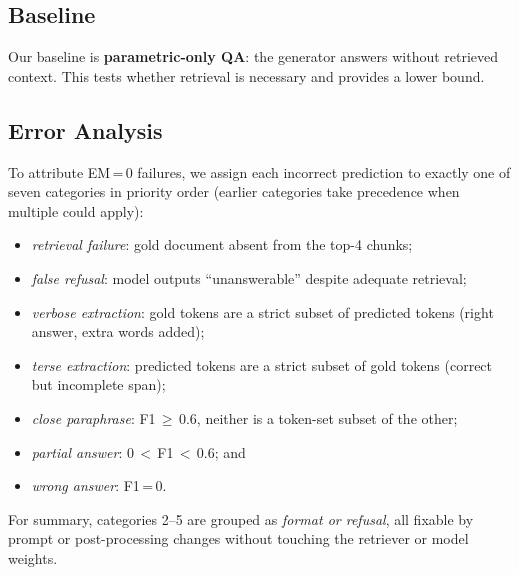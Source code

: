 \documentclass[11pt]{article}
\begin{document}
\subsection{Baseline}

Our baseline is \textbf{parametric-only QA}: the generator answers without retrieved
context. This tests whether retrieval is necessary and provides a lower bound.

\subsection{Error Analysis}

To attribute EM\,=\,0 failures, we assign each incorrect prediction to exactly one of
seven categories in priority order (earlier categories take precedence when multiple could apply):
\begin{itemize}
  \item \textit{retrieval failure}: gold document absent from the top-4 chunks;
  \item \textit{false refusal}: model outputs ``unanswerable'' despite adequate
    retrieval;
  \item \textit{verbose extraction}: gold tokens are a strict subset of predicted
    tokens (right answer, extra words added);
  \item \textit{terse extraction}: predicted tokens are a strict subset of gold
    tokens (correct but incomplete span);
  \item \textit{close paraphrase}: F1\,$\geq$\,0.6, neither is a token-set subset
    of the other;
  \item \textit{partial answer}: 0\,$<$\,F1\,$<$\,0.6; and
  \item \textit{wrong answer}: F1\,=\,0.
\end{itemize}
For summary, categories 2--5 are grouped as \emph{format or refusal}, all fixable by
prompt or post-processing changes without touching the retriever or model weights.
\end{document}

